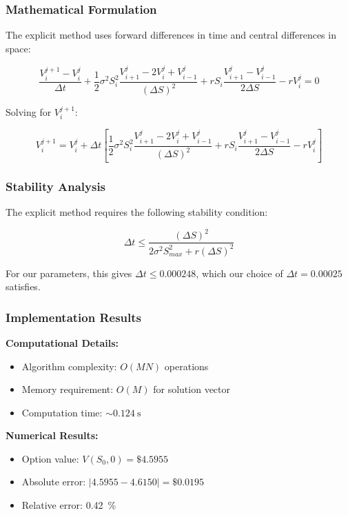 \documentclass[12pt,a4paper]{article}
\numberwithin{algorithm}{subsection}
\begin{document}
\subsubsection{Mathematical Formulation}

The explicit method uses forward differences in time and central differences in space:

\begin{equation}
\frac{V_i^{j+1} - V_i^j}{\Delta t} + \frac{1}{2}\sigma^2 S_i^2 \frac{V_{i+1}^j - 2V_i^j + V_{i-1}^j}{(\Delta S)^2} + rS_i \frac{V_{i+1}^j - V_{i-1}^j}{2\Delta S} - rV_i^j = 0
\end{equation}

Solving for $V_i^{j+1}$:

\begin{equation}
V_i^{j+1} = V_i^j + \Delta t \left[ \frac{1}{2}\sigma^2 S_i^2 \frac{V_{i+1}^j - 2V_i^j + V_{i-1}^j}{(\Delta S)^2} + rS_i \frac{V_{i+1}^j - V_{i-1}^j}{2\Delta S} - rV_i^j \right]
\end{equation}

\subsubsection{Stability Analysis}

The explicit method requires the following stability condition:

\begin{equation}
\Delta t \leq \frac{(\Delta S)^2}{2\sigma^2 S_{max}^2 + r(\Delta S)^2}
\end{equation}

For our parameters, this gives $\Delta t \leq 0.000248$, which our choice of $\Delta t = 0.00025$ satisfies.

\subsubsection{Implementation Results}

\textbf{Computational Details:}
\begin{itemize}
\item Algorithm complexity: $O(MN)$ operations
\item Memory requirement: $O(M)$ for solution vector
\item Computation time: $\sim\SI{0.124}{\second}$
\end{itemize}

\textbf{Numerical Results:}
\begin{itemize}
\item Option value: $V(S_0, 0) = \$4.5955$
\item Absolute error: $|4.5955 - 4.6150| = \$0.0195$
\item Relative error: \SI{0.42}{\percent}
\end{itemize}
\end{document}
